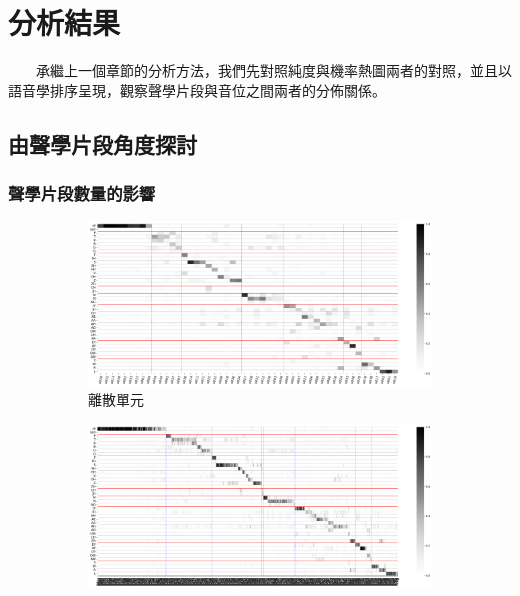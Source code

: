 \section{分析結果} 
{
　　承繼上一個章節的分析方法，我們先對照純度與機率熱圖兩者的對照，並且以語音學排序呈現，觀察聲學片段與音位之間兩者的分佈關係。

\subsection{由聲學片段角度探討}
{
\subsubsection{聲學片段數量的影響}

{
    {
        \newcommand{\tempwidth}[0]{0.8\linewidth}
        \begin{figure}
             \centering
             \begin{subfigure}{\textwidth}
                 \centering
                 \includegraphics[width=\tempwidth]{feasiblefigs/ch4figs/hub-u050-ap0000-givenunit-byphn.png}
                 \caption{離散單元}
                 \label{fig:hub-u050-ap0000-givenunit-byphn}
             \end{subfigure}
             \vfill
             \begin{subfigure}{\textwidth}
                 \centering
                 \includegraphics[width=\tempwidth]{feasiblefigs/ch4figs/hub-u050-ap0500-givenunit-byphn.png}

\end{subfigure}
\end{figure}}}}}
